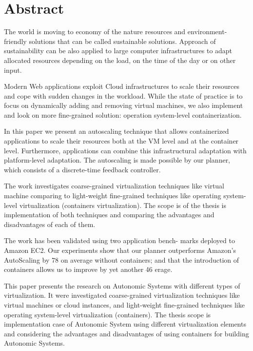 \newpage
\chapter*{Abstract}

The world is moving to economy of the nature resources and environment-friendly solutions that can be called sustainable solutions. Approach of sustainability can be also applied to large computer infrastructures to adapt allocated resources depending on the load, on the time of the day or on other input.

Modern Web applications exploit Cloud infrastructures to
scale their resources and cope with sudden changes in the
workload. While the state of practice is to focus on dynamically adding and removing virtual machines, we also implement and look on more fine-grained solution: operation system-level containerization.

In this paper we present an autoscaling technique that allows containerized applications to scale their resources both at the VM level and at the container level. Furthermore, applications can combine this infrastructural adaptation with platform-level adaptation. The autoscaling is made possible by our planner, which consists of a discrete-time feedback
controller.

The work investigates coarse-grained virtualization techniques like virtual machine comparing to light-weight fine-grained techniques like operating system-level virtualization (containers virtualization). The scope is of the thesis is implementation of both techniques and comparing the advantages and disadvantages of each of them.

\ifx
The work has been validated using two application bench-
marks deployed to Amazon EC2. Our experiments show
that our planner outperforms Amazon’s AutoScaling by 78%
on average without containers; and that the introduction of
containers allows us to improve by yet another 46%
erage.

This paper presents the research on Autonomic Systems with different types of virtualization. It were investigated coarse-grained virtualization techniques like virtual machines or cloud instances, and light-weight fine-grained techniques like operating system-level virtualization (containers). The thesis scope is implementation case of Autonomic System using different virtualization elements and considering the advantages and disadvantages of using containers for building Autonomic Systems.
\fi